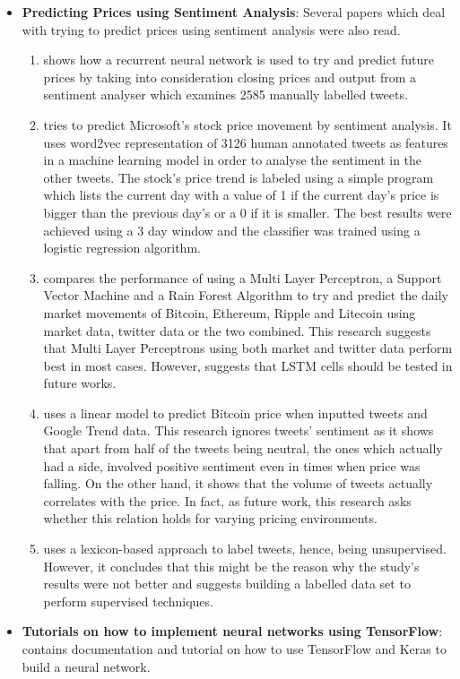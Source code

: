 \documentclass{article}
\begin{document}
\begin{itemize}
	\item \textbf{Predicting Prices using Sentiment Analysis}: Several papers which deal with trying to predict prices using sentiment analysis were also read. 
	\begin{enumerate}
	\item \cite{sapp1} shows how a recurrent neural network is used to try and predict future prices by taking into consideration closing prices and output from a sentiment analyser which examines 2585 manually labelled tweets. 
	\item \cite{sapp2} tries to predict Microsoft's stock price movement by sentiment analysis. It uses word2vec representation of 3126 human annotated tweets as features in a machine learning model in order to analyse the sentiment in the other tweets. The stock's price trend is labeled using a simple program which lists the current day with a value of 1 if the current day's price is bigger than the previous day's or a 0 if it is smaller. The best results were achieved using a 3 day window and the classifier was trained using a logistic regression algorithm.
	\item \cite{sapp3} compares the performance of using a Multi Layer Perceptron, a Support Vector Machine and a Rain Forest Algorithm to try and predict the daily market movements of Bitcoin, Ethereum, Ripple and Litecoin using market data, twitter data or the two combined. This research suggests that Multi Layer Perceptrons using both market and twitter data perform best in most cases. However, suggests that LSTM cells should be tested in future works. 
	\item \cite{sapp5} uses a linear model to predict Bitcoin price when inputted tweets and Google Trend data. This research ignores tweets' sentiment as it shows that apart from half of the tweets being neutral, the ones which actually had a side, involved positive sentiment even in times when price was falling. On the other hand, it shows that the volume of tweets actually correlates with the price. In fact, as future work, this research asks whether this relation holds for varying pricing environments.
	\item \cite{sapp6} uses a lexicon-based approach to label tweets, hence, being unsupervised. However, it concludes that this might be the reason why the study's results were not better and suggests building a labelled data set to perform supervised techniques.
	\end{enumerate}
	\item \textbf{Tutorials on how to implement neural networks using TensorFlow}: \cite{tensorflow} contains documentation and tutorial on how to use TensorFlow and Keras to build a neural network. 
	\end{itemize}
	
\end{document}
